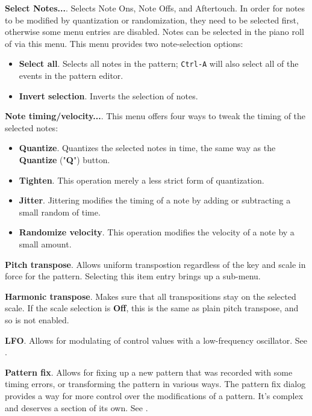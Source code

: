    \begin{enumber}
      \item \textbf{Select Notes...}.
      Selects Note Ons, Note Offs, and Aftertouch.
      In order for notes to be modified by quantization or randomization,
      they need to be selected first, otherwise some menu entries are
      disabled.
      Notes can be selected in the piano roll of via this menu.
      This menu provides two note-selection options:
         \begin{itemize}
            \item \textbf{Select all}. Selects all notes in the pattern;
                \texttt{Ctrl-A} will also select
               all of the events in the pattern editor.
            \item \textbf{Invert selection}. Inverts the selection of notes.
         \end{itemize}
      \item \textbf{Note timing/velocity...}. This menu
            offers four ways to tweak the timing of the selected notes:
         \begin{itemize}
            \item \textbf{Quantize}.
               Quantizes the selected notes in time, the same way as the
               \textbf{Quantize} ("\textbf{Q}") button.
            \item \textbf{Tighten}.
               This operation merely a less strict form of quantization.
            \item \textbf{Jitter}.
               Jittering modifies the timing of a note by adding or subtracting
               a small random of time.
            \item \textbf{Randomize velocity}.
               This operation modifies the velocity of a note by a small
               amount.
         \end{itemize}
      \item \textbf{Pitch transpose}. Allows uniform transpostion
         regardless of the key and scale in force for the pattern.
         Selecting this item entry brings up a sub-menu.
      \item \textbf{Harmonic transpose}. Makes sure
         that all transpositions stay on the selected scale.
         If the scale selection is \textbf{Off}, this is the same as plain
         pitch transpose, and so is not enabled.
      \item \textbf{LFO}. Allows for modulating of control values with a
         low-frequency oscillator.
         See .
      \item \textbf{Pattern fix}. Allows for fixing up a new pattern
         that was recorded with some timing errors, or transforming the
         pattern in various ways.
      The pattern fix dialog provides a way for more control over the
      modifications of a pattern.
      It's complex and deserves a section of its own.
      See .
   \end{enumber}


